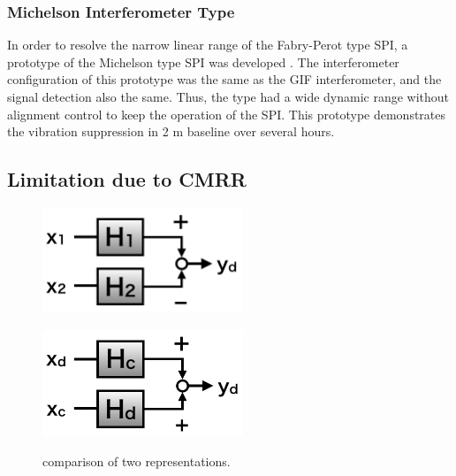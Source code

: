 \subsubsection{Michelson Interferometer Type}
In order to resolve the narrow linear range of the Fabry-Perot type SPI, a prototype of the Michelson type SPI was developed \cite{Numata2008interferometric}. The interferometer configuration of this prototype was the same as the GIF interferometer, and the signal detection also the same. Thus, the type had a wide dynamic range without alignment control to keep the operation of the SPI. This prototype demonstrates the vibration suppression in 2 m baseline over several hours.

\subsection{Limitation due to CMRR}\label{sec532}
\begin{figure}[h]
  \begin{minipage}[t]{0.5\hsize}
    \centering
    \includegraphics[width=6cm]{./img_chap5/img510a.png}
     \label{img:img510a}
  \end{minipage}
  \begin{minipage}[t]{0.5\hsize}
    \centering
    \includegraphics[width=6cm]{./img_chap5/img510b.png}
     \label{img:img510b}
  \end{minipage}
  \caption{comparison of two representations.}
\end{figure}

